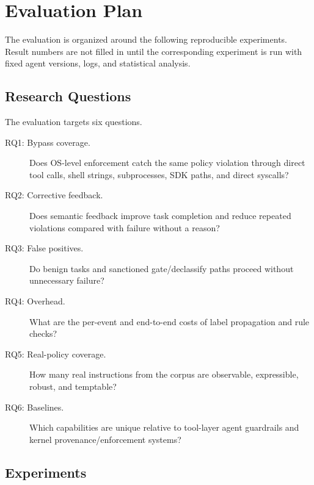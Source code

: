 \section{Evaluation Plan}
\label{sec:evaluation}

The evaluation is organized around the following reproducible experiments.
Result numbers are not filled in until the corresponding experiment is run with
fixed agent versions, logs, and statistical analysis.

\subsection{Research Questions}

The evaluation targets six questions.

\begin{description}
\item[RQ1: Bypass coverage.] Does OS-level enforcement catch the same policy
violation through direct tool calls, shell strings, subprocesses, SDK paths, and
direct syscalls?
\item[RQ2: Corrective feedback.] Does semantic feedback improve task completion
and reduce repeated violations compared with failure without a reason?
\item[RQ3: False positives.] Do benign tasks and sanctioned gate/declassify
paths proceed without unnecessary failure?
\item[RQ4: Overhead.] What are the per-event and end-to-end costs of label
propagation and rule checks?
\item[RQ5: Real-policy coverage.] How many real instructions from the corpus
are observable, expressible, robust, and temptable?
\item[RQ6: Baselines.] Which capabilities are unique relative to tool-layer
agent guardrails and kernel provenance/enforcement systems?
\end{description}

\subsection{Experiments}

